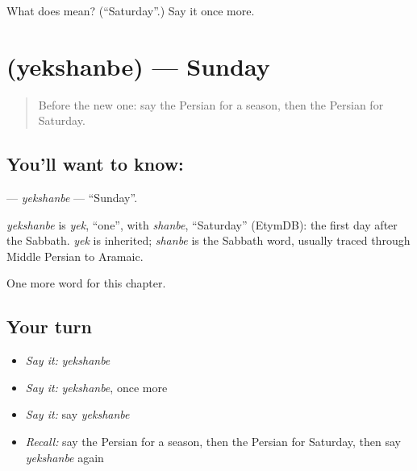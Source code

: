 \begin{tcolorbox}[breakable,colback=teal!4,colframe=teal!35!black,title={Before you move on}]
What does  mean? (\textquotedblleft{}Saturday\textquotedblright{}.) Say it once more.
\end{tcolorbox}
\section[\texorpdfstring{\fa{یکشنبه} (yekshanbe)}{یکشنبه (yekshanbe)}]{ (yekshanbe) — Sunday}

\label{lesson:FA-C81-yekshanbe}



\begin{quote}
Before the new one: say the Persian for a season, then the Persian for Saturday.
\end{quote}

\subsection*{You'll want to know: }
\textbf{} — \emph{yekshanbe} — \textquotedblleft{}Sunday\textquotedblright{}.

\begin{cousinweb}
\emph{yekshanbe} is \emph{yek}, \textquotedblleft{}one\textquotedblright{}, with \emph{shanbe}, \textquotedblleft{}Saturday\textquotedblright{} (EtymDB): the first day after the Sabbath. \emph{yek} is inherited; \emph{shanbe} is the Sabbath word, usually traced through Middle Persian to Aramaic.
\end{cousinweb}

\begin{grammarlens}[title={What you've built}]
One more word for this chapter.
\end{grammarlens}

\subsection*{Your turn}
\begin{itemize}
\raggedright
  \item \emph{Say it:} \emph{yekshanbe}
  \item \emph{Say it:} \emph{yekshanbe}, once more
  \item \emph{Say it:} say \emph{yekshanbe}
  \item \emph{Recall:} say the Persian for a season, then the Persian for Saturday, then say \emph{yekshanbe} again
\end{itemize}

